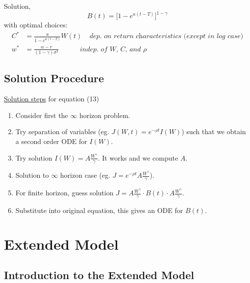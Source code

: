 \documentclass[
14pt,notheorems,hyperref={pdfauthor=whatever}
]{beamer}
\begin{document}
\begin{frame}
Solution,\\
\[ B(t) = \bigg[ 1-e^{a(t-T)}\bigg]^{1-\gamma}\]
with optimal choices:\\
\begin{align*}
    C^* &= \frac{a}{1-e^{a(t-T)}}W(t)\;\;\;\; \textit{dep. on return characteristics (except in log case)}\\
    w^* &= \frac{\alpha-r}{(1-\gamma)\sigma^2}\;\;\;\;\;\;\;\;\;\;\;\textit{indep. of W, C, and $\rho$}
\end{align*}
\end{frame}

\subsection{Solution Procedure}
\begin{frame}
\underline{Solution steps} for equation (13)\\
\begin{enumerate}
    \item Consider first the $\infty$ horizon problem.
    \item Try separation of variables (eg. $J(W,t) = e^{-\rho t} I(W)$) such that we obtain a second order ODE for $I(W)$.
    \item Try solution $I(W) = A \frac{W^\gamma}{\gamma}$. It works and we compute $A$.
    \item Solution to $\infty$ horizon case (eg. $J = e^{-\rho t} A \frac{W^\gamma}{\gamma}$).
    \item For finite horizon, guess solution $J = A \frac{W^\gamma}{\gamma}\cdot B(t) \cdot A\frac{W^\gamma}{\gamma}$.
    \item Substitute into original equation, this gives an ODE for $B(t)$.
\end{enumerate}
\end{frame}

\section{Extended Model}

\subsection{Introduction to the Extended Model}
\end{document}
